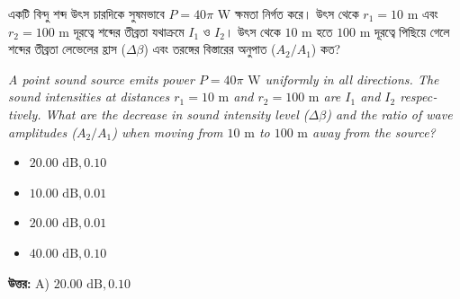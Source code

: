 \documentclass[12pt, a4paper]{article}
\begin{document}
\begin{tcolorbox}[questionbox={প্রশ্ন (Question) 14}]
    \noindent
    একটি বিন্দু শব্দ উৎস চারদিকে সুষমভাবে $P = 40\pi\text{ W}$ ক্ষমতা নির্গত করে। উৎস থেকে $r_1 = 10\text{ m}$ এবং $r_2 = 100\text{ m}$ দূরত্বে শব্দের তীব্রতা যথাক্রমে $I_1$ ও $I_2$। উৎস থেকে $10\text{ m}$ হতে $100\text{ m}$ দূরত্বে পিছিয়ে গেলে শব্দের তীব্রতা লেভেলের হ্রাস ($\Delta \beta$) এবং তরঙ্গের বিস্তারের অনুপাত ($A_2 / A_1$) কত?
    
    \vspace{0.8em}
    \begin{english}
    \noindent\textit{\color{darkgray}
    A point sound source emits power $P = 40\pi\text{ W}$ uniformly in all directions. The sound intensities at distances $r_1 = 10\text{ m}$ and $r_2 = 100\text{ m}$ are $I_1$ and $I_2$ respectively. What are the decrease in sound intensity level ($\Delta \beta$) and the ratio of wave amplitudes ($A_2 / A_1$) when moving from $10\text{ m}$ to $100\text{ m}$ away from the source?
    }
    \end{english}
\end{tcolorbox}

\begin{itemize}[label={}, leftmargin=1cm, itemsep=0.5em]
    \item[\textbf{A)}] $20.00\text{ dB}, 0.10$
    \item[\textbf{B)}] $10.00\text{ dB}, 0.01$
    \item[\textbf{C)}] $20.00\text{ dB}, 0.01$
    \item[\textbf{D)}] $40.00\text{ dB}, 0.10$
\end{itemize}

\vspace{0.5em}
\begin{tcolorbox}[answerbox]
    \textbf{\color{success} উত্তর:} A) $20.00\text{ dB}, 0.10$
\end{tcolorbox}
\vspace{1em}
\end{document}
